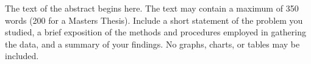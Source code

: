 \thesisabstract
{
	The text of the abstract begins here. The text may contain a maximum of 350 
	words (200 for a Masters Thesis). Include a short statement of the problem
	you studied, a brief exposition of the methods and procedures employed in
	gathering the data, and a summary of your findings. No graphs, charts, or
	tables may be included.

}

